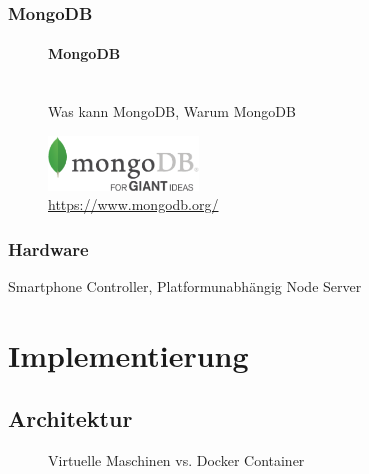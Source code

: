 \documentclass[a4paper]{spie}  %
\begin{document}
\subsubsection{MongoDB}
\hfill
\begin{figure}[H]
\begin{minipage}[t]{0.4\textwidth}
\vspace{0pt}
\paragraph{MongoDB}\mbox{}\\
Was kann MongoDB, Warum MongoDB
\end{minipage}
\hfill
\begin{minipage}[t]{0.5\textwidth}
\vspace{0pt}
		\includegraphics[width=4cm, right]{./images/software/mongodb-logo}
		\caption{\url{https://www.mongodb.org/} }
		\label{fig:test2}
\end{minipage}
\end{figure}


\subsubsection{Hardware}
Smartphone Controller, Platformunabhängig Node Server

%
%

\section{Implementierung}


\subsection{Architektur}

\begin{figure}[h]
	\centering
		\caption{Virtuelle Maschinen vs. Docker Container\cite{dockercontainer}}
		\label{fig:dockerVM}
\end{figure}
\end{document}
